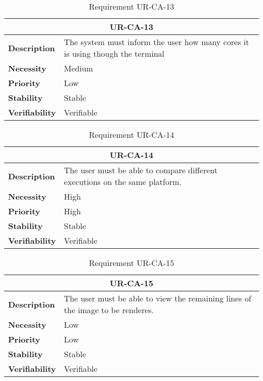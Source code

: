 \begin{table}[H]
    \centering
    \begin{tabular}{l p{10cm}}
        \toprule
        \multicolumn{2}{c}{UR-CA-13} \\
        \toprule
        \textbf{Description}        & The system must inform the user how many cores it is using though the terminal \\
        \textbf{Necessity}          & Medium   \\
        \textbf{Priority}           & Low   \\
        \textbf{Stability}          & Stable \\
        \textbf{Verifiability}      & Verifiable \\
    \end{tabular}
    \caption{Requirement UR-CA-13}
    \label{tab:ur-ca-13}
\end{table}

\begin{table}[H]
    \centering
    \begin{tabular}{l p{10cm}}
        \toprule
        \multicolumn{2}{c}{UR-CA-14} \\
        \toprule
        \textbf{Description}        & The user must be able to compare different executions on the same platform. \\
        \textbf{Necessity}          & High   \\
        \textbf{Priority}           & High   \\
        \textbf{Stability}          & Stable \\
        \textbf{Verifiability}      & Verifiable \\
    \end{tabular}
    \caption{Requirement UR-CA-14}
    \label{tab:ur-ca-14}
\end{table}

\begin{table}[H]
    \centering
    \begin{tabular}{l p{10cm}}
        \toprule
        \multicolumn{2}{c}{UR-CA-15} \\
        \toprule
        \textbf{Description}        & The user must be able to view the remaining lines of the image to be renderes. \\
        \textbf{Necessity}          & Low   \\
        \textbf{Priority}           & Low   \\
        \textbf{Stability}          & Stable \\
        \textbf{Verifiability}      & Verifiable \\
    \end{tabular}
    \caption{Requirement UR-CA-15}
    \label{tab:ur-ca-15}
\end{table}

